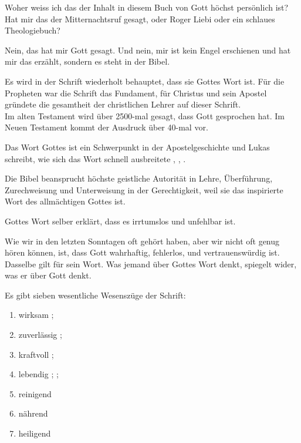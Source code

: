 \begin{otsblock}
    Woher weiss ich das der Inhalt in diesem Buch von Gott höchst persönlich ist? Hat mir das der Mitternachtsruf gesagt, oder Roger Liebi oder ein schlaues Theologiebuch?

    Nein, das hat mir Gott gesagt. Und nein, mir ist kein Engel erschienen und hat mir das erzählt, sondern es steht in der Bibel.

    Es wird in der Schrift wiederholt behauptet, dass sie Gottes Wort ist. Für die Propheten war die Schrift das Fundament, für Christus und sein Apostel gründete die gesamtheit der christlichen Lehrer auf dieser Schrift.\\
    Im alten Testament wird über 2500-mal gesagt, dass Gott gesprochen hat. Im Neuen Testament kommt der Ausdruck  über 40-mal vor.

    Das Wort Gottes ist ein Schwerpunkt in der Apostelgeschichte und Lukas schreibt, wie sich das Wort schnell ausbreitete , , .

    Die Bibel beansprucht höchste geistliche Autorität in Lehre, Überführung, Zurechweisung und Unterweisung in der Gerechtigkeit, weil sie das inspirierte Wort des allmächtigen Gottes ist. 

    Gottes Wort selber erklärt, dass es irrtumslos und unfehlbar ist.

    Wie wir in den letzten Sonntagen oft gehört haben, aber wir nicht oft genug hören können, ist, dass Gott wahrhaftig, fehlerlos, und vertrauenswürdig ist. Dasselbe gilt für sein Wort. Was jemand über Gottes Wort denkt, spiegelt wider, was er über Gott denkt.

    Es gibt sieben wesentliche Wesenszüge der Schrift:
    \begin{enumerate}
        \item wirksam ; 
        \item zuverlässig ; 
        \item kraftvoll ; 
        \item lebendig ; ; 
        \item reinigend 
        \item nährend 
        \item heiligend 
    \end{enumerate}
\end{otsblock}
\newpage